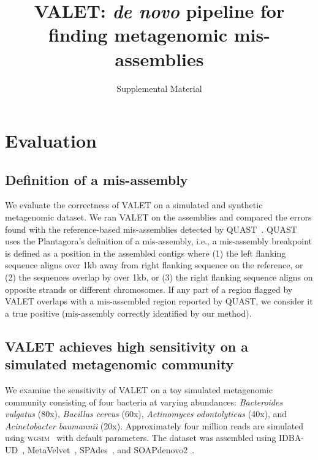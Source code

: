 \documentclass{article}
\begin{document}
\title{VALET: \emph{de novo} pipeline for finding metagenomic mis-assemblies}
\author{Supplemental Material}
\date{}
\maketitle

\section{Evaluation}
\subsection{Definition of a mis-assembly}
We evaluate the correctness of VALET on a simulated and synthetic metagenomic dataset.
We ran VALET on the assemblies and compared the errors found with the reference-based mis-assemblies detected by QUAST~\citep{gurevich2013quast}.
QUAST uses the Plantagora’s definition of a mis-assembly,
i.e., a mis-assembly breakpoint is defined as a position in the assembled contigs where (1) the left flanking
sequence aligns over 1kb away from right flanking sequence on the reference, or (2) the sequences overlap by
over 1kb, or (3) the right flanking sequence aligns on opposite strands or different chromosomes.
If any part of a region flagged by VALET overlaps with a mis-assembled region reported by QUAST, we consider it a true positive (mis-assembly correctly identified by our method).

\subsection{VALET achieves high sensitivity on a simulated metagenomic community}

We examine the sensitivity of VALET on a toy simulated metagenomic community consisting of four bacteria at varying abundances: \emph{Bacteroides vulgatus} (80x), \emph{Bacillus cereus} (60x), \emph{Actinomyces odontolyticus} (40x), and \emph{Acinetobacter baumannii} (20x).
Approximately four million reads are simulated using \textsc{wgsim}~\citep{li2013wgsim} with default parameters.
The dataset was assembled using IDBA-UD~\citep{peng2012idba}, MetaVelvet~\citep{namiki2012metavelvet}, SPAdes~\citep{bankevich2012spades}, and SOAPdenovo2~\citep{luo2012soapdenovo2}.
\end{document}

